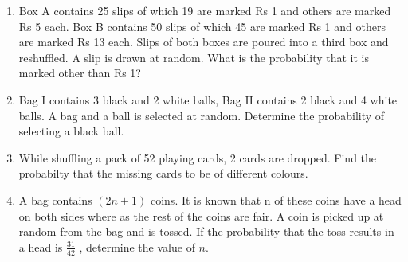 \begin{enumerate}[label=\thechapter.\arabic*,ref=\thechapter.\theenumi]
\solution
		
\item Box A contains 25 slips of which 19 are marked Rs 1 and others are marked Rs 5 each. Box B contains 50 slips of which 45 are marked Rs 1 and others are marked Rs 13 each. Slips of both boxes are poured into a third box and reshuffled. A slip is drawn at random. What is the probability that it is marked other than Rs 1?\\
\solution

\item Bag I contains 3 black and 2 white balls, Bag II contains 2 black and 4 white
balls. A bag and a ball is selected at random. Determine the probability of selecting
a black ball.\\
\solution

\item While shuffling a pack of 52 playing cards, 2 cards are dropped. Find the probabilty that the missing cards to be of different colours.\\
\solution

\item A bag contains $(2n + 1)$ coins. It is known that n of these coins have a head on
both sides where as the rest of the coins are fair. A coin is picked up at random
from the bag and is tossed. If the probability that the toss results in a head is $\frac{31}{42}$
, determine the value of $n$.\\
\solution

\end{enumerate}
